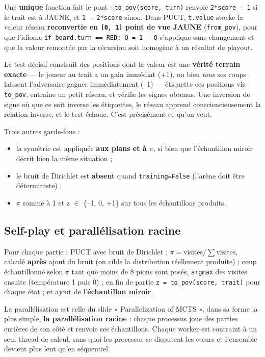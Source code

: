 \documentclass[11pt,a4paper]{article}
\begin{document}
Une \textbf{unique} fonction fait le pont :
\texttt{to\_pov(score,\ turn)} renvoie \texttt{2*score\ -\ 1} si le trait est à
JAUNE, et \texttt{1\ -\ 2*score} sinon.
Dans PUCT, \texttt{t.value} stocke la valeur réseau \textbf{reconvertie en \texttt{{[}0,\ 1{]}} point de
vue JAUNE} (\texttt{from\_pov}), pour que l'idiome \texttt{if\ board.turn\ ==\ RED:\ Q\ =\ 1\ -\ Q}
s'applique sans changement et que la valeur remontée par la récursion soit
homogène à un résultat de playout.

Le test décisif construit des positions dont la valeur est une \textbf{vérité terrain
exacte} --- le joueur au trait a un gain immédiat (+1), ou bien \emph{tous} ses coups
laissent l'adversaire gagner immédiatement (--1) --- étiquette ces positions via
\texttt{to\_pov}, entraîne un petit réseau, et vérifie les signes obtenus. Une inversion
de signe où que ce soit inverse les étiquettes, le réseau apprend consciencieusement
la relation inverse, et le test échoue. C'est précisément ce qu'on veut.

Trois autres garde-fous :

\begin{itemize}
\setlength{\itemsep}{1pt}\setlength{\parskip}{0pt}
\item
  la symétrie est appliquée \textbf{aux plans et à $\pi$}, si bien que l'échantillon
  miroir décrit bien la même situation ;
\item
  le bruit de Dirichlet est \textbf{absent} quand \texttt{training=False} (l'arène doit être
  déterministe) ;
\item
  $\pi$ somme à 1 et z $\in$ \{--1, 0, +1\} sur tous les échantillons produits.
\end{itemize}

\subsection{Self-play et parallélisation racine}\label{self-play-et-paralluxe9lisation-racine}

Pour chaque partie : PUCT avec bruit de Dirichlet ; $\pi = \text{visites}/\sum\text{visites}$, calculé \textbf{après} ajout du bruit (on cible la distribution
réellement produite) ; coup échantillonné selon $\pi$ tant que moins de 8 pions
sont posés, \texttt{argmax} des visites ensuite (température 1 puis 0) ; en fin de
partie \texttt{z\ =\ to\_pov(score,\ trait)} pour chaque état ; et
ajout de l'\textbf{échantillon miroir}.

La parallélisation est celle du slide « Parallelization of MCTS », dans sa forme
la plus simple, \textbf{la parallélisation racine} : chaque processus joue des parties
entières de son côté et renvoie ses échantillons. Chaque worker est contraint à un
seul thread de calcul, sans quoi les processus se disputent les cœurs et
l'ensemble devient plus lent qu'en séquentiel.
\end{document}
